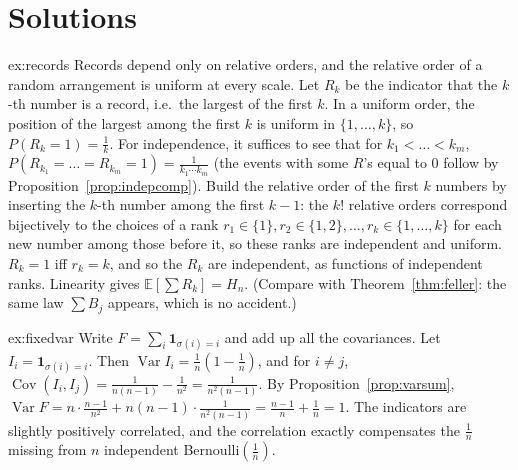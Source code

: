 \section{Solutions}

\begin{solution}{ex:records}
\idea Records depend only on relative orders, and the relative order of a random arrangement is uniform at every
scale.
\writeup Let $R_k$ be the indicator that the $k$-th number is a record, i.e.\ the largest of the first $k$. In a uniform
order, the position of the largest among the first $k$ is uniform in $\{1,\dots,k\}$, so $P(R_k=1)=\frac1k$. For
independence, it suffices to see that for $k_1<\dots<k_m$, $P(R_{k_1}=\dots=R_{k_m}=1)=\frac1{k_1\cdots k_m}$ (the events
with some $R$'s equal to $0$ follow by Proposition~\ref{prop:indepcomp}). Build the relative order of the first $k$
numbers by inserting the $k$-th number among the first $k-1$: the $k!$ relative orders correspond bijectively to
the choices of a rank $r_1\in\{1\},r_2\in\{1,2\},\dots,r_k\in\{1,\dots,k\}$ for each new number among those before it, so
these ranks are independent and uniform. $R_k=1$ iff $r_k=k$, and so the $R_k$ are independent, as functions of
independent ranks. Linearity gives $\mathbb E[\sum R_k]=H_n$. (Compare with Theorem~\ref{thm:feller}: the same law $\sum B_j$
appears, which is no accident.)
\end{solution}

\begin{solution}{ex:fixedvar}
\idea Write $F=\sum_i\mathbf 1_{\sigma(i)=i}$ and add up all the covariances.
\writeup Let $I_i=\mathbf 1_{\sigma(i)=i}$. Then $\operatorname{Var}I_i=\frac1n(1-\frac1n)$, and for $i\ne j$, $\operatorname{Cov}(I_i,I_j)=\frac1{n(n-1)}-\frac1{n^2}=\frac1{n^2(n-1)}$.
By Proposition~\ref{prop:varsum}, $\operatorname{Var}F=n\cdot\frac{n-1}{n^2}+n(n-1)\cdot\frac1{n^2(n-1)}=\frac{n-1}n+\frac1n=1$. The indicators are slightly
positively correlated, and the correlation exactly compensates the $\frac1n$ missing from $n$ independent Bernoulli$(\frac1n)$.
\end{solution}

